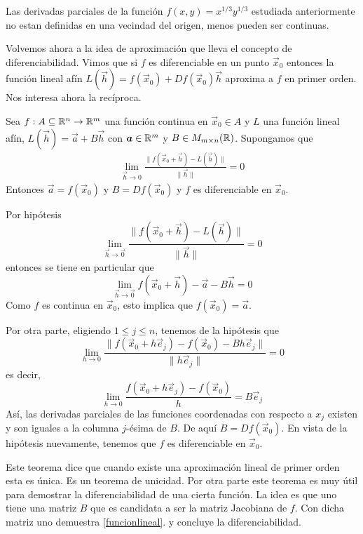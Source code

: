 \begin{ejemplo} 
Las derivadas parciales de la funci\'on $f(x,y)=x^{1/3}y^{1/3}$
estudiada anteriormente no estan definidas en una vecindad del origen, menos
pueden ser continuas.
\end{ejemplo}

Volvemos ahora a la idea  de aproximaci\'on que lleva el concepto de diferenciabilidad. 
Vimos que si $f$ es diferenciable en un punto $\vec{x}_0$ 
entonces la funci\'on lineal af\'in $L(\vec{h})=f(\vec{x}_0)+Df(\vec{x}_0)\vec{h}$ aproxima a $f$ 
en primer orden. Nos interesa ahora la rec\'iproca.
\begin{teorema}\label{teolinealafin} 
Sea  $f:A\subseteq\mathbb{R}^n\to\mathbb{R}^m$ una funci\'on continua en $\vec{x}_0\in A$ y $L$ una
funci\'on lineal af\'in, $L(\vec{h})=\vec{a}+B\vec{h}$ con $\boldsymbol{a}\in\mathbb{R}^m$ y $B\in M_{m\times n}(\mathbb{R})$.
Supongamos que
\begin{gather} \label{funcionlineal}
\lim_{\vec{h}\to 0}\frac{\|f(\vec{x}_0+\vec{h})-L(\vec{h})\|}{\|\vec{h}\|}=0
\end{gather}
Entonces $\vec{a}=f(\vec{x}_0)$ y $B=Df(\vec{x}_0)$ y  $f$ es diferenciable en $\vec{x}_0$.
\end{teorema}

\begin{demostracion} 
Por hip\'otesis $$\lim_{\vec{h}\to \vec{0}}\frac{\|f(\vec{x}_0+\vec{h})-L(\vec{h})\|}{\|\vec{h}\|}=0$$
entonces se tiene en particular que$$\lim_{\vec{h}\to \vec{0}}f(\vec{x}_0+\vec{h})-\vec{a}-B\vec{h}=0$$
Como $f$ es continua en $\vec{x}_0$, esto implica que 
$f(\vec{x}_0)=\vec{a}$.

Por otra parte, eligiendo $1\le j\le n$, tenemos de la hip\'otesis que
$$\lim_{h\to 0}\frac{\|f(\vec{x}_0+h\vec{e}_j)-f(\vec{x}_0)- Bh\vec{e}_j \|}{\|h\vec{e}_j\|}=0$$
es decir,
$$
\lim_{h\to 0}\frac{f(\vec{x}_0+h\vec{e}_j)-f(\vec{x}_0)}{h}=B\vec{e}_j
$$
As\'i, las derivadas parciales de las funciones coordenadas con respecto
a $x_j$ existen y son iguales a la  columna $j$-\'esima de $B$. De aqu\'i
$B=Df(\vec{x}_0)$. En vista de la hip\'otesis nuevamente, tenemos que $f$ es diferenciable en $\vec{x}_0$.
\end{demostracion}

Este teorema dice que cuando existe una aproximaci\'on lineal
de primer orden esta es \'unica. Es un teorema de unicidad. Por otra parte este teorema es muy \'util para demostrar la diferenciabilidad de
una cierta funci\'on. La idea es que uno tiene una matriz $B$ que es candidata 
a ser
la matriz Jacobiana de $f$. Con dicha matriz uno demuestra \eqref{funcionlineal}. y concluye la
diferenciabilidad.

